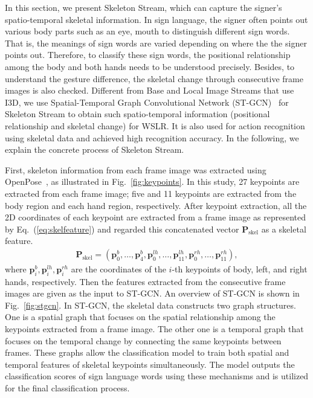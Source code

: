\documentclass[journal]{IEEEtran}
\begin{document}
In this section, we present Skeleton Stream, which can capture the signer's spatio-temporal skeletal information. In sign language, the signer often points out various body parts such as an eye, mouth to distinguish different sign words. That is, the meanings of sign words are varied depending on where the the signer points out. Therefore, to classify these sign words, the positional relationship among the body and both hands needs to be understood precisely. Besides, to understand the gesture difference, the skeletal change through consecutive frame images is also checked. Different from Base and Local Image Streams that use I3D, we use Spatial-Temporal Graph Convolutional Network (ST-GCN)~\cite{yan2018stgcn} for Skeleton Stream to obtain such spatio-temporal information (positional relationship and skeletal change) for WSLR. It is also used for action recognition using skeletal data and achieved high recognition accuracy. In the following, we explain the concrete process of Skeleton Stream. 

First, skeleton information from each frame image was extracted using OpenPose~\cite{cao2017openpose}, as illustrated in Fig.~\ref{fig:keypoints}. 
In this study, 27 keypoints are extracted from each frame image;  five and 11 keypoints are extracted from the body region and each hand region, respectively. After keypoint extraction, all the 2D coordinates of each keypoint are extracted from a frame image as represented by Eq.~(\ref{eq:skelfeature}) and regarded this concatenated vector $\bm{P}_\mathrm{skel}$ as a skeletal feature. 
\begin{align}
    \bm{P}_\mathrm{skel} = (\bm{p}_0^b, \dots, \bm{p}_4^b, \bm{p}_0^{lh}, \dots, \bm{p}_{11}^{lh}, 
    \bm{p}_0^{rh}, \dots, \bm{p}_{11}^{rh}),
    \label{eq:skelfeature}
\end{align}
where $\bm{p}_i^b, \bm{p}_i^{lh}, \bm{p}_i^{rh}$ are the coordinates of the $i$-th keypoints of body, left, and right hands, respectively. Then the features extracted from the consecutive frame images are given as the input to ST-GCN. An overview of ST-GCN is shown in Fig.~\ref{fig:stgcn}. In ST-GCN, the skeletal data constructs two graph structures. One is a spatial graph that focuses on the spatial relationship among the keypoints extracted from a frame image. The other one is a temporal graph that focuses on the temporal change by connecting the same keypoints between frames. These graphs allow the classification model to train both spatial and temporal features of skeletal keypoints simultaneously. The model outputs the classification scores of sign language words using these mechanisms and is utilized for the final classification process.
\end{document}
